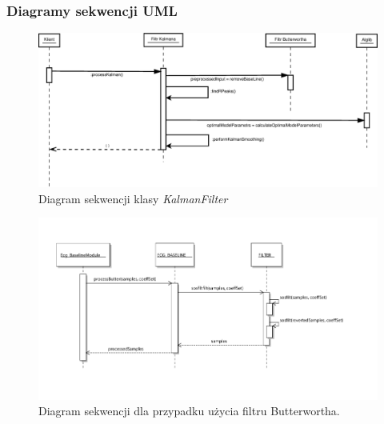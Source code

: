 \subsubsection{Diagramy sekwencji UML}

\begin{figure}[H]
\centering
	\includegraphics[width=\textwidth]{ECG_BASELINE/figures/KalmanDiagram.eps}
\caption{Diagram sekwencji klasy \textit{KalmanFilter}}
\label{KF-Diagram}
\end{figure}

\begin{figure}[H]
\centering
	\includegraphics[width=1.1\textwidth]{ECG_BASELINE/figures/butter_seq.pdf}
\caption{Diagram sekwencji dla przypadku użycia filtru Butterwortha.}
\label{MA-seq}
\end{figure}

